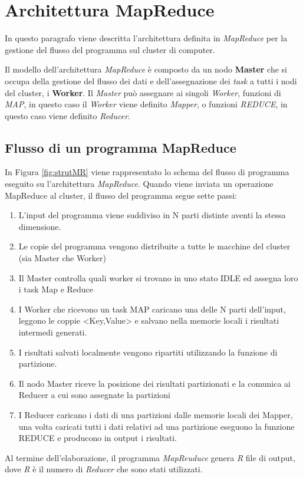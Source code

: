 \documentclass[LaM,binding=0.6cm]{sapthesis}
\begin{document}
\begin{minipage}{\linewidth}

\end{minipage}

\section{Architettura MapReduce}

In questo paragrafo viene descritta l'architettura definita in \textit{MapReduce} \cite{Dean:2008:MSD:1327452.1327492} per la gestione del flusso del programma sul cluster di computer.

Il modello dell'architettura \textit{MapReduce} è composto da un nodo \textbf{Master} che si occupa della gestione del flusso dei dati e dell'assegnazione dei \textit{task} a  tutti i nodi del cluster, i \textbf{Worker}.
Il \textit{Master}  può assegnare ai singoli \textit{Worker}, funzioni di \textit{MAP}, in questo caso il \textit{Worker} viene definito \textit{Mapper}, o funzioni \textit{REDUCE}, in questo caso viene definito \textit{Reducer}.

\subsection{Flusso di un programma MapReduce}

In Figura \ref{fig:strutMR} viene rappresentato lo schema del flusso di programma eseguito su l'architettura \textit{MapReduce}. Quando viene inviata un operazione MapReduce al cluster, il flusso del programma segue sette passi:

\begin{enumerate}
\item L’input del programma viene suddiviso in N parti distinte aventi la stessa dimensione.
\item Le copie del programma vengono distribuite a tutte le macchine del cluster (sia Master che Worker)
\item Il Master controlla quali worker si trovano in uno stato IDLE ed assegna loro i task Map e Reduce
\item I Worker che ricevono un task MAP caricano una delle N parti dell'input, leggono le coppie <Key,Value> e salvano nella memorie locali i risultati intermedi generati.
\item I risultati salvati localmente vengono ripartiti utilizzando la funzione di partizione.
\item Il nodo Master riceve la posizione dei risultati partizionati e la comunica ai Reducer a cui sono assegnate la partizioni
\item I Reducer caricano i dati di una partizioni dalle memorie locali dei Mapper, una volta caricati tutti i dati relativi ad una partizione eseguono la funzione REDUCE e producono in output i risultati.
\end{enumerate}
Al termine dell'elaborazione, il programma \textit{MapReuduce} genera \textit{R} file di output, dove \textit{R} è il numero di \textit{Reducer} che sono stati utilizzati.
\end{document}
